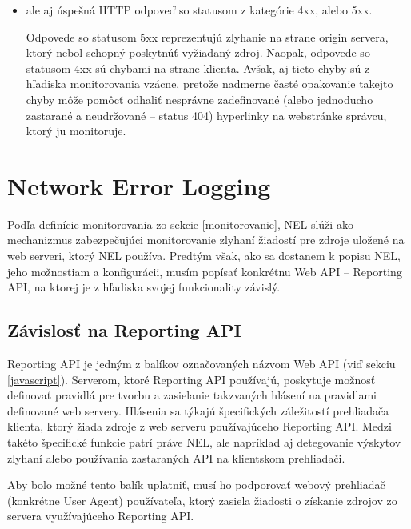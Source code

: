 \begin{enumerate}
\begin{itemize}
        \item ale aj úspešná HTTP odpoveď so statusom z kategórie 4xx, alebo 5xx.

        Odpovede so statusom 5xx reprezentujú zlyhanie na strane origin servera, ktorý nebol schopný poskytnúť vyžiadaný zdroj.
        Naopak, odpovede so statusom 4xx sú chybami na strane klienta. 
        Avšak, aj tieto chyby sú z hľadiska monitorovania vzácne, pretože nadmerne časté opakovanie takejto chyby môže pomôcť odhaliť nesprávne zadefinované (alebo jednoducho zastarané a neudržované -- status 404) hyperlinky na webstránke správcu, ktorý ju monitoruje. 
    \end{itemize}
    
\end{enumerate}


\section{Network Error Logging}
\label{network-error-logging}

Podľa definície monitorovania zo sekcie \ref{monitorovanie}, NEL slúži ako mechanizmus
zabezpečujúci monitorovanie zlyhaní žiadostí pre zdroje uložené na web serveri, ktorý NEL používa.
Predtým však, ako sa dostanem k popisu NEL, jeho možnostiam a konfigurácii, musím popísať konkrétnu Web API -- Reporting API, na ktorej je z hľadiska svojej funkcionality závislý.

\subsection{Závislosť na Reporting API}
\label{reporting-api}

Reporting API je jedným z balíkov označovaných názvom Web API (viď sekciu \ref{javascript}).
Serverom, ktoré Reporting API používajú, poskytuje možnosť definovať pravidlá pre 
tvorbu a zasielanie takzvaných hlásení na pravidlami definované web servery.
Hlásenia sa týkajú špecifických záležitostí prehliadača klienta, ktorý žiada zdroje z web serveru používajúceho Reporting API.
Medzi takéto špecifické funkcie patrí práve NEL, ale napríklad aj detegovanie výskytov zlyhaní alebo používania zastaraných API na klientskom prehliadači.

Aby bolo možné tento balík uplatniť, musí ho podporovať webový prehliadač (konkrétne User Agent) používateľa, ktorý zasiela žiadosti o získanie zdrojov zo servera využívajúceho Reporting API.

